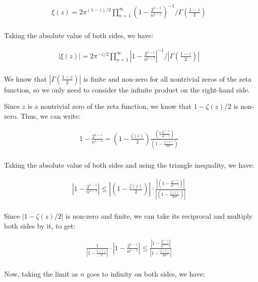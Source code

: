 \documentclass{article}
\begin{document}
\begin{align*}
\xi(z) = 2 \pi^{(1-z)/2} \prod_{n=1}^{\infty} \left(1 - \frac{2^{1-z}}{n^{1-z}}\right)^{-1} / \Gamma\left(\frac{1-z}{2}\right) \\
\end{align*}

Taking the absolute value of both sides, we have:

\begin{align*}
|\xi(z)| = 2 \pi^{-z/2} \prod_{n=1}^{\infty} \left|1 - \frac{2^{1-z}}{n^{1-z}}\right|^{-1} / |\Gamma\left(\frac{1-z}{2}\right)| \\
\end{align*}

We know that $|\Gamma\left(\frac{1-z}{2}\right)|$ is finite and non-zero for all nontrivial zeros of the zeta function, so we only need to consider the infinite product on the right-hand side.

Since $z$ is a nontrivial zero of the zeta function, we know that $1 - \zeta(z)/2$ is non-zero. Thus, we can write:

\begin{align*}
1 - \frac{2^{1-z}}{n^{1-z}} = \left(1 - \frac{\zeta(z)}{2}\right) \frac{\left(1\frac{2^{1-z}}{n^{1-z}}\right)}{\left(1 - \frac{\zeta(z)}{2n^{z}}\right)} \\
\end{align*}

Taking the absolute value of both sides and using the triangle inequality, we have:

\begin{align*}
\left|1 - \frac{2^{1-z}}{n^{1-z}}\right| \leq \left|\left(1 - \frac{\zeta(z)}{2}\right)\right| \cdot \frac{\left|\left(1 - \frac{2^{1-z}}{n^{1-z}}\right)\right|}{\left|\left(1 - \frac{\zeta(z)}{2n^{z}}\right)\right|} \\
\end{align*}

Since $|1 - \zeta(z)/2|$ is non-zero and finite, we can take its reciprocal and multiply both sides by it, to get:

\begin{align*}
\frac{1}{\left|1 - \frac{\zeta(z)}{2}\right|} \cdot \left|1 - \frac{2^{1-z}}{n^{1-z}}\right| \leq \frac{\left|1 - \frac{2^{1-z}}{n^{1-z}}\right|}{\left|1 - \frac{\zeta(z)}{2n^{z}}\right|} \\
\end{align*}

Now, taking the limit as $n$ goes to infinity on both sides, we have:
\end{document}
